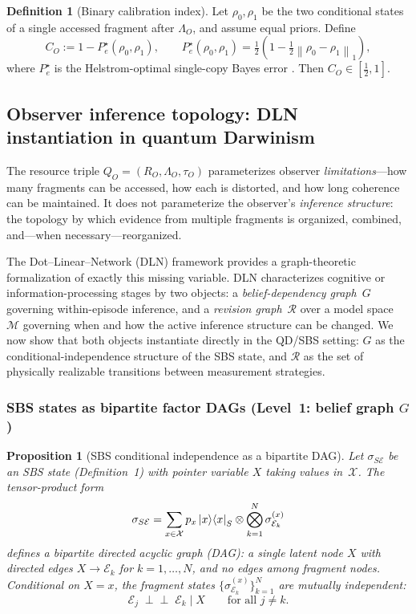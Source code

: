 \documentclass[11pt]{article}
\newcommand{\cE}{\mathcal{E}}
\newcommand{\cX}{\mathcal{X}}
\newcommand{\normone}[1]{\left\lVert #1\right\rVert_{1}}
\newcommand{\1}{\mathbf{1}}
\theoremstyle{definition}
\newtheorem{definition}{Definition}
\theoremstyle{plain}
\newtheorem{proposition}{Proposition}
\begin{document}
\begin{definition}[Binary calibration index]
Let $\rho_0,\rho_1$ be the two conditional states of a single accessed fragment after $\Lambda_O$, and assume equal priors.
Define
\begin{equation}
C_O:=1-P_e^\star(\rho_0,\rho_1),
\qquad
P_e^\star(\rho_0,\rho_1)=\tfrac12\left(1-\tfrac12\normone{\rho_0-\rho_1}\right),
\label{eq:calibration}
\end{equation}
where $P_e^\star$ is the Helstrom-optimal single-copy Bayes error \citep{Helstrom1976,Watrous2018}.
Then $C_O\in[\tfrac12,1]$.
\end{definition}


\subsection{Observer inference topology: DLN instantiation in quantum Darwinism}
\label{sec:qstates}

The resource triple $Q_O=(R_O,\Lambda_O,\tau_O)$ parameterizes observer
\emph{limitations}---how many fragments can be accessed, how each is
distorted, and how long coherence can be maintained.
It does not parameterize the observer's \emph{inference structure}: the
topology by which evidence from multiple fragments is organized, combined,
and---when necessary---reorganized.

The Dot--Linear--Network (DLN) framework
\citep{WuDLNCompression2026preprint} provides a graph-theoretic
formalization of exactly this missing variable.
DLN characterizes cognitive or information-processing stages by two
objects:
a \emph{belief-dependency graph}~$G$ governing within-episode inference,
and a \emph{revision graph}~$\mathcal{R}$ over a model
space~$\mathcal{M}$ governing when and how the active inference
structure can be changed.
We now show that both objects instantiate directly in the QD/SBS setting:
$G$ as the conditional-independence structure of the SBS state, and
$\mathcal{R}$ as the set of physically realizable transitions between
measurement strategies.


\subsubsection{SBS states as bipartite factor DAGs (Level~1: belief graph $G$)}

\begin{proposition}[SBS conditional independence as a bipartite DAG]
\label{prop:sbs-dag}
Let $\sigma_{S\cE}$ be an SBS state (Definition~1) with pointer variable
$X$ taking values in~$\cX$.  The tensor-product form
\begin{equation}
  \sigma_{S\cE}
  = \sum_{x\in\cX} p_x \ket{x}\!\bra{x}_S
    \otimes \bigotimes_{k=1}^{N} \sigma^{(x)}_{\cE_k}
  \label{eq:sbs-factor}
\end{equation}
defines a bipartite directed acyclic graph (DAG): a single latent node
$X$ with directed edges $X \to \cE_k$ for $k=1,\dots,N$, and no edges
among fragment nodes.
Conditional on $X=x$, the fragment states
$\{\sigma^{(x)}_{\cE_k}\}_{k=1}^{N}$ are mutually independent:
\[
  \cE_j \;\perp\!\!\!\perp\; \cE_k \mid X
  \qquad \text{for all } j\neq k.
\]
\end{proposition}
\end{document}
